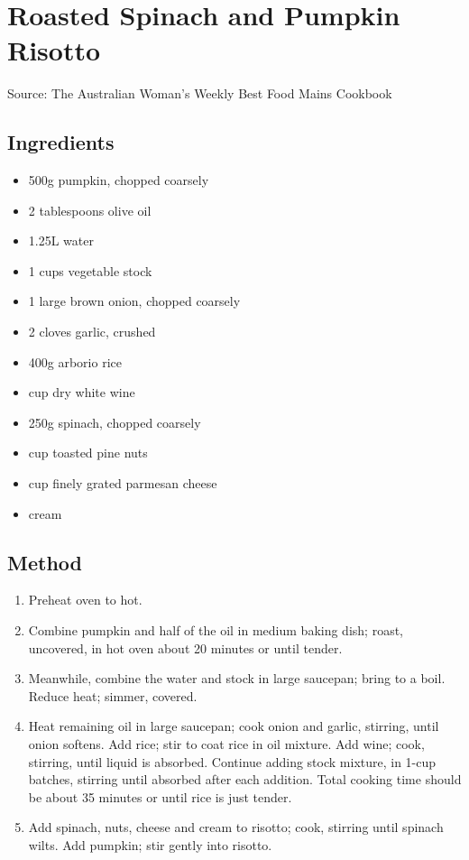 \clearpage
\section{Roasted Spinach and Pumpkin Risotto}


Source: The Australian Woman's Weekly Best Food Mains Cookbook

\subsection{Ingredients}

\begin{itemize}
	\item 500g pumpkin, chopped coarsely
	\item 2 tablespoons olive oil
	\item 1.25L water
	\item 1 cups vegetable stock
	\item 1 large brown onion, chopped coarsely
	\item 2 cloves garlic, crushed
	\item 400g arborio rice
	\item {} cup dry white wine
	\item 250g spinach, chopped coarsely
	\item {} cup toasted pine nuts
	\item {} cup finely grated parmesan cheese
	\item {} cream
\end{itemize}

\subsection{Method}

\begin{enumerate}
	\item Preheat oven to hot.
	\item Combine pumpkin and half of the oil in medium baking dish; roast, uncovered, in hot oven about 20 minutes or until tender.
	\item Meanwhile, combine the water and stock in large saucepan; bring to a boil. Reduce heat; simmer, covered.
	\item Heat remaining oil in large saucepan; cook onion and garlic, stirring, until onion softens. Add rice; stir to coat rice in oil mixture. Add wine; cook, stirring, until liquid is absorbed. Continue adding stock mixture, in 1-cup batches, stirring until absorbed after each addition. Total cooking time should be about 35 minutes or until rice is just tender.
	\item Add spinach, nuts, cheese and cream to risotto; cook, stirring until spinach wilts. Add pumpkin; stir gently into risotto.
\end{enumerate}
